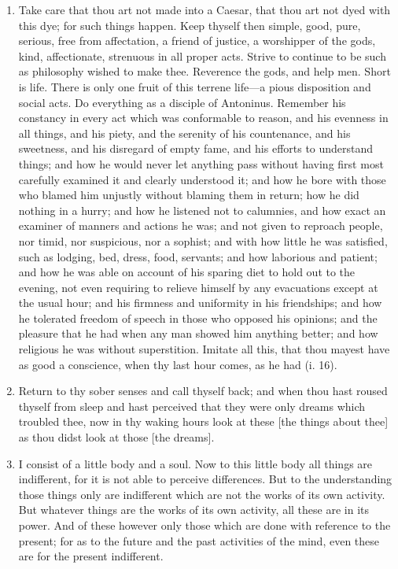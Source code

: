 \begin{enumerate}
\item Take care that thou art not made into a Caesar, that thou art not dyed with this dye; for such things happen. Keep thyself then simple, good, pure, serious, free from affectation, a friend of justice, a worshipper of the gods, kind, affectionate, strenuous in all proper acts. Strive to continue to be such as philosophy wished to make thee. Reverence the gods, and help men. Short is life. There is only one fruit of this terrene life—a pious disposition and social acts. Do everything as a disciple of Antoninus. Remember his constancy in every act which was conformable to reason, and his evenness in all things, and his piety, and the serenity of his countenance, and his sweetness, and his disregard of empty fame, and his efforts to understand things; and how he would never let anything pass without having first most carefully examined it and clearly understood it; and how he bore with those who blamed him unjustly without blaming them in return; how he did nothing in a hurry; and how he listened not to calumnies, and how exact an examiner of manners and actions he was; and not given to reproach people, nor timid, nor suspicious, nor a sophist; and with how little he was satisfied, such as lodging, bed, dress, food, servants; and how laborious and patient; and how he was able on account of his sparing diet to hold out to the evening, not even requiring to relieve himself by any evacuations except at the usual hour; and his firmness and uniformity in his friendships; and how he tolerated freedom of speech in those who opposed his opinions; and the pleasure that he had when any man showed him anything better; and how religious he was without superstition. Imitate all this, that thou mayest have as good a conscience, when thy last hour comes, as he had (i. 16).

\item Return to thy sober senses and call thyself back; and when thou hast roused thyself from sleep and hast perceived that they were only dreams which troubled thee, now in thy waking hours look at these [{\clarify the things about thee}] as thou didst look at those [{\clarify the dreams}].

\item I consist of a little body and a soul. Now to this little body all things are indifferent, for it is not able to perceive differences. But to the understanding those things only are indifferent which are not the works of its own activity. But whatever things are the works of its own activity, all these are in its power. And of these however only those which are done with reference to the present; for as to the future and the past activities of the mind, even these are for the present indifferent.


\end{enumerate}
